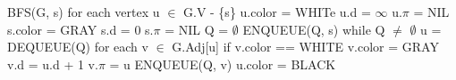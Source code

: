 \documentclass[preview]{standalone}
\begin{document}
\begin{center}
BFS(G, s)
for each vertex u $\in$ G.V - \{s\}
    u.color = WHITe
    u.d = $\infty$
    u.$\pi$ = NIL
s.color = GRAY
s.d = 0
s.$\pi$ = NIL
Q = $\emptyset$
ENQUEUE(Q, s)
while Q $\neq$ $\emptyset$
    u = DEQUEUE(Q)
    for each v $\in$ G.Adj[u]
        if v.color == WHITE
            v.color = GRAY
            v.d = u.d + 1
            v.$\pi$ = u
            ENQUEUE(Q, v)
    u.color = BLACK
\end{center}
\end{document}
